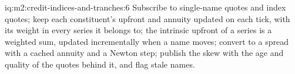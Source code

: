 \begin{solution}{iq:m2:credit-indices-and-tranches:6}
Subscribe to single-name quotes and index quotes; keep each constituent's upfront and
annuity updated on each tick, with its weight in every series it belongs to; the
intrinsic upfront of a series is a weighted sum, updated incrementally when a name
moves; convert to a spread with a cached annuity and a Newton step; publish the skew
with the age and quality of the quotes behind it, and flag stale names.
\end{solution}
